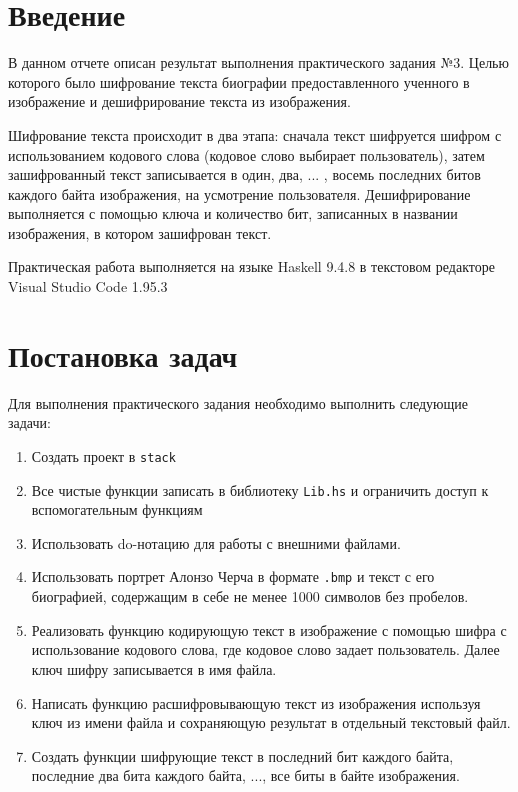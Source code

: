 \documentclass[10pt,a4paper,final]{article} %
\begin{document}
\tableofcontents

\newpage

\section* {Введение}
\par В данном отчете описан результат выполнения практического задания №3. Целью которого было шифрование текста биографии предоставленного ученного в изображение и дешифрирование текста из  изображения.

Шифрование текста происходит в два этапа: сначала текст шифруется шифром с использованием кодового слова (кодовое слово выбирает пользователь), затем зашифрованный текст записывается в один, два, ... , восемь последних битов каждого байта изображения, на усмотрение пользователя. Дешифрирование выполняется с помощью ключа и количество бит, записанных в названии изображения, в котором зашифрован текст.

Практическая работа выполняется на языке Haskell 9.4.8 в текстовом редакторе Visual Studio Code 1.95.3

\newpage
\section {Постановка задач}

Для выполнения практического задания необходимо выполнить следующие задачи:
\begin{enumerate}
	\item Создать проект в \texttt{stack}
	\item Все чистые функции записать в библиотеку \texttt{Lib.hs} и ограничить доступ к вспомогательным функциям
	\item Использовать do-нотацию для работы с внешними файлами.
	\item Использовать портрет Алонзо Черча в формате \texttt{.bmp} и текст с его биографией, содержащим в себе не менее 1000 символов без пробелов. 
	\item Реализовать функцию кодирующую текст в изображение с помощью шифра с использование кодового слова, где кодовое слово задает пользователь. Далее ключ шифру записывается в имя файла.
	\item Написать функцию расшифровывающую текст из изображения используя ключ из имени файла и сохраняющую результат в отдельный текстовый файл.
	\item Создать функции шифрующие текст в последний бит каждого байта, последние два бита каждого байта, ..., все биты в байте изображения. 
\end{enumerate}
\end{document}
